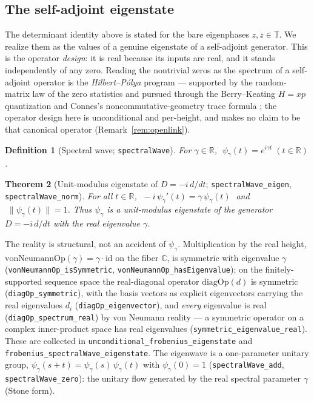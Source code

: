 \documentclass[11pt]{article}
\newtheorem{definition}{Definition}[section]
\newtheorem{theorem}[definition]{Theorem}
\newcommand{\C}{\mathbb{C}}
\newcommand{\R}{\mathbb{R}}
\newcommand{\T}{\mathbb{T}}
\newcommand{\conj}[1]{\overline{#1}}
\newcommand{\code}[1]{\texttt{#1}}
\begin{document}
\subsection{The self-adjoint eigenstate}\label{sub:eigenstate}

The determinant identity above is stated for the bare eigenphases $z,\conj z\in\T$. We realize them
as the values of a genuine eigenstate of a self-adjoint generator. This is the operator
\emph{design}: it is real because its inputs are real, and it stands independently of any zero.
Reading the nontrivial zeros as the spectrum of a self-adjoint operator is the
\emph{Hilbert--P\'olya} program --- supported by the random-matrix law of the zero statistics
\cite{Montgomery1973} and pursued through the Berry--Keating $H=xp$ quantization
\cite{BerryKeating1999} and Connes's noncommutative-geometry trace formula \cite{Connes1999}; the
operator design here is unconditional and per-height, and makes no claim to be that canonical
operator (Remark~\ref{rem:openlink}).

\begin{definition}[Spectral wave; \code{spectralWave}]\label{def:wave}
For $\gamma\in\R$, $\;\psi_\gamma(t)=e^{i\gamma t}\;(t\in\R)$.
\end{definition}

\begin{theorem}[Unit-modulus eigenstate of $D=-i\,d/dt$; \code{spectralWave\_eigen}, \code{spectralWave\_norm}]\label{thm:wave}
For all $t\in\R$, $\;-i\,\psi_\gamma'(t)=\gamma\,\psi_\gamma(t)\;$ and $\;\|\psi_\gamma(t)\|=1$. Thus
$\psi_\gamma$ is a unit-modulus eigenstate of the generator $D=-i\,d/dt$ with the real eigenvalue
$\gamma$.
\end{theorem}

The reality is structural, not an accident of $\psi_\gamma$. Multiplication by the real height,
$\mathrm{vonNeumannOp}(\gamma)=\gamma\cdot\mathrm{id}$ on the fiber $\C$, is symmetric with
eigenvalue $\gamma$ (\code{vonNeumannOp\_isSymmetric}, \code{vonNeumannOp\_hasEigenvalue}); on the
finitely-supported sequence space the real-diagonal operator $\mathrm{diagOp}(d)$ is symmetric
(\code{diagOp\_symmetric}), with the basis vectors as explicit eigenvectors carrying the real
eigenvalues $d_i$ (\code{diagOp\_eigenvector}), and \emph{every} eigenvalue is real
(\code{diagOp\_spectrum\_real}) by von Neumann reality --- a symmetric operator on a complex
inner-product space has real eigenvalues (\code{symmetric\_eigenvalue\_real}). These are collected in
\code{unconditional\_frobenius\_eigenstate} and \code{frobenius\_spectralWave\_eigenstate}. The
eigenwave is a one-parameter unitary group, $\psi_\gamma(s+t)=\psi_\gamma(s)\,\psi_\gamma(t)$ with
$\psi_\gamma(0)=1$ (\code{spectralWave\_add}, \code{spectralWave\_zero}): the unitary flow generated by
the real spectral parameter $\gamma$ (Stone form).
\end{document}
